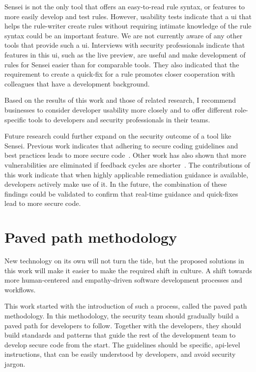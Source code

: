 Sensei is not the only tool that offers an easy-to-read rule syntax, or features to more easily develop and test rules.
However, usability tests indicate that a \gls{ui} that helps the rule-writer create rules without requiring intimate knowledge of the rule syntax could be an important feature.
We are not currently aware of any other tools that provide such a \gls{ui}.
Interviews with security professionals indicate that features in this \gls{ui}, such as the live preview, are useful and make development of rules for Sensei easier than for comparable tools.
They also indicated that the requirement to create a quick-fix for a rule promotes closer cooperation with colleagues that have a development background.

Based on the results of this work and those of related research, I recommend businesses to consider developer usability more closely and to offer different role-specific tools to developers and security professionals in their teams.

Future research could further expand on the security outcome of a tool like Sensei.
Previous work indicates that adhering to secure coding guidelines and best practices leads to more secure code~\cite{lipfordimpact,votipka2020understanding}.
Other work has also shown that more vulnerabilities are eliminated if feedback cycles are shorter~\cite{sampaio2016exploring}.
The contributions of this work indicate that when highly applicable remediation guidance is available, developers actively make use of it.
In the future, the combination of these findings could be validated to confirm that real-time guidance and quick-fixes lead to more secure code.

\section{Paved path methodology}
New technology on its own will not turn the tide, but the proposed solutions in this work will make it easier to make the required shift in culture.
A shift towards more human-centered and empathy-driven software development processes and workflows.

This work started with the introduction of such a process, called the paved path methodology.
In this methodology, the security team should gradually build a paved path for developers to follow.
Together with the developers, they should build standards and patterns that guide the rest of the development team to develop secure code from the start.
The guidelines should be specific, \gls{api}-level instructions, that can be easily understood by developers, and avoid security jargon.

